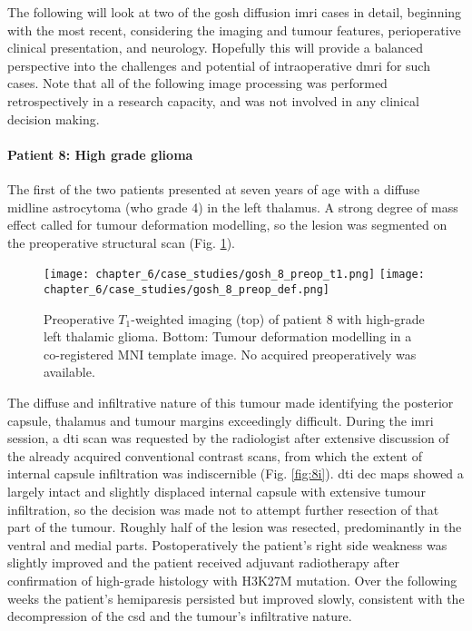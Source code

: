 The following will look at two of the \gls{gosh} diffusion \gls{imri} cases in detail, beginning with the most recent, considering the imaging and tumour features, perioperative clinical presentation, and neurology.
Hopefully this will provide a balanced perspective into the challenges and potential of intraoperative \gls{dmri} for such cases.
Note that all of the following image processing was performed retrospectively in a research capacity, and was not involved in any clinical decision making.

\paragraph*{Patient 8: High grade glioma}

The first of the two patients presented at seven years of age with a diffuse midline astrocytoma (\gls{who} grade 4) in the left thalamus.
A strong degree of mass effect called for tumour deformation modelling, so the lesion was segmented on the preoperative structural scan (Fig. \ref{fig:8p}).

\begin{figure}[htb!]
  \centering
  \texttt{[image: chapter\_6/case\_studies/gosh\_8\_preop\_t1.png]}
  \texttt{[image: chapter\_6/case\_studies/gosh\_8\_preop\_def.png]}
  \caption[GOSH iMRI patient 8, preoperative imaging]{Preoperative $T_1$-weighted imaging (top) of patient 8 with high-grade left thalamic glioma. Bottom: Tumour deformation modelling in a co-registered MNI template image. No  acquired preoperatively was available.}
  \label{fig:8p}
\end{figure}

The diffuse and infiltrative nature of this tumour made identifying the posterior capsule, thalamus and tumour margins exceedingly difficult.
During the \gls{imri} session, a \gls{dti} scan was requested by the radiologist after extensive discussion of the already acquired conventional contrast scans, from which the extent of internal capsule infiltration was indiscernible (Fig. \ref{fig:8i}).
\Gls{dti} \gls{dec} maps showed a largely intact and slightly displaced internal capsule with extensive tumour infiltration, so the decision was made not to attempt further resection of that part of the tumour.
Roughly half of the lesion was resected, predominantly in the ventral and medial parts.
Postoperatively the patient's right side weakness was slightly improved and the patient received adjuvant radiotherapy after confirmation of high-grade histology with H3K27M mutation.
Over the following weeks the patient's hemiparesis persisted but improved slowly, consistent with the decompression of the \gls{csd} and the tumour's infiltrative nature.

